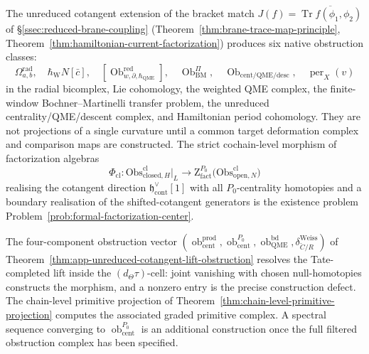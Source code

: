\documentclass[11pt]{memoir}
\begin{document}
The unreduced cotangent extension of the bracket match
\(J(f)=\overline{\operatorname{Tr}f(\phi_1,\phi_2)}\) of
\S\ref{ssec:reduced-brane-coupling}
(Theorem~\ref{thm:brane-trace-map-principle},
Theorem~\ref{thm:hamiltonian-current-factorization}) produces six
native obstruction classes:
\[
  \Omega^{\mathrm{rad}}_{a,b},\quad
  \hbar_{\mathrm{W}}N[\bar c],\quad
  [\operatorname{Ob}^{\mathrm{red}}_{w,\partial,\hbar_{\mathrm{QME}}}],\quad
  \operatorname{Ob}^{\Pi}_{\mathrm{BM}},\quad
  \operatorname{Ob}_{\mathrm{cent/QME/desc}},\quad
  \operatorname{per}_X(v)
\]
in the radial bicomplex, Lie cohomology, the weighted QME complex, the
finite-window Bochner--Martinelli transfer problem, the unreduced
centrality/QME/descent complex, and Hamiltonian period cohomology.
They are not projections of a single curvature until a common target
deformation complex and comparison maps are constructed.  The strict cochain-level
morphism of factorization algebras
\[
  \Phi_{\mathrm{cl}}\colon
  \mathrm{Obs}^{\mathrm{cl}}_{\mathrm{closed},H}\big|_L
    \longrightarrow
  \mathrm Z^{P_0}_{\mathrm{fact}}\bigl(\mathrm{Obs}^{\mathrm{cl}}_{\mathrm{open},N}\bigr)
\]
realising the cotangent direction
\(\mathfrak h^\vee_{\mathrm{cont}}[1]\) with all \(P_0\)-centrality
homotopies and a boundary realisation of the shifted-cotangent
generators is the existence problem
Problem~\ref{prob:formal-factorization-center}.

The four-component obstruction vector
\((\operatorname{ob}^{\mathrm{prod}}_{\mathrm{cent}},
\operatorname{ob}^{P_0}_{\mathrm{cent}},
\operatorname{ob}^{\mathrm{bd}}_{\mathrm{QME}},
\delta^{\mathrm{Weiss}}_{\check C/R})\) of
Theorem~\ref{thm:app-unreduced-cotangent-lift-obstruction} resolves
the Tate-completed lift inside the
\((d_\Theta\tau)\)-cell:
joint vanishing with chosen null-homotopies constructs the morphism,
and a nonzero entry is the precise construction defect.  The
chain-level primitive projection of
Theorem~\ref{thm:chain-level-primitive-projection} computes the
associated graded primitive complex.  A spectral sequence converging
to \(\operatorname{ob}^{P_0}_{\mathrm{cent}}\) is an additional
construction once the full filtered obstruction complex has been
specified.
\end{document}
